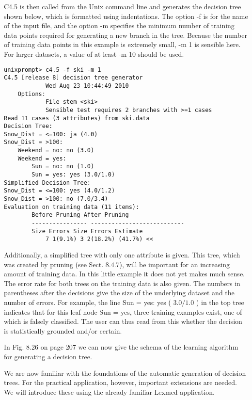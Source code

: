 \documentclass[10pt]{article}
\begin{document}
C4.5 is then called from the Unix command line and generates the decision tree shown below, which is formatted using indentations. The option -f is for the name of the input file, and the option -m specifies the minimum number of training data points required for generating a new branch in the tree. Because the number of training data points in this example is extremely small, -m 1 is sensible here. For larger datasets, a value of at least -m 10 should be used.

\begin{verbatim}
unixprompt> c4.5 -f ski -m 1
C4.5 [release 8] decision tree generator
            Wed Aug 23 10:44:49 2010
    Options:
            File stem <ski>
            Sensible test requires 2 branches with >=1 cases
Read 11 cases (3 attributes) from ski.data
Decision Tree:
Snow_Dist = <=100: ja (4.0)
Snow_Dist = >100:
    Weekend = no: no (3.0)
    Weekend = yes:
        Sun = no: no (1.0)
        Sun = yes: yes (3.0/1.0)
Simplified Decision Tree:
Snow_Dist = <=100: yes (4.0/1.2)
Snow_Dist = >100: no (7.0/3.4)
Evaluation on training data (11 items):
        Before Pruning After Pruning
        ---------------- ---------------------------
        Size Errors Size Errors Estimate
            7 1(9.1%) 3 2(18.2%) (41.7%) <<
\end{verbatim}

Additionally, a simplified tree with only one attribute is given. This tree, which was created by pruning (see Sect. 8.4.7), will be important for an increasing amount of training data. In this little example it does not yet makes much sense. The error rate for both trees on the training data is also given. The numbers in parentheses after the decisions give the size of the underlying dataset and the number of errors. For example, the line Sun = yes: yes ( $3.0 / 1.0$ ) in the top tree indicates that for this leaf node Sun = yes, three training examples exist, one of which is falsely classified. The user can thus read from this whether the decision is statistically grounded and/or certain.

In Fig. 8.26 on page 207 we can now give the schema of the learning algorithm for generating a decision tree.

We are now familiar with the foundations of the automatic generation of decision trees. For the practical application, however, important extensions are needed. We will introduce these using the already familiar Lexmed application.
\end{document}
